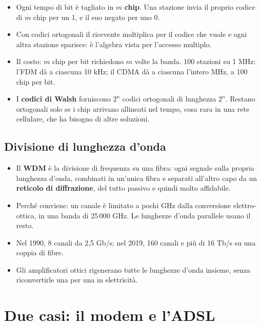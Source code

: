 \begin{itemize}
    \item Ogni tempo di bit è tagliato in $m$ \textbf{chip}. Una stazione invia il proprio codice di $m$ chip per un 1, e il suo negato
          per uno 0.
    \item Con codici ortogonali il ricevente moltiplica per il codice che vuole e ogni altra stazione sparisce: è l'algebra vista per
          l'accesso multiplo.
    \item Il costo: $m$ chip per bit richiedono $m$ volte la banda. 100 stazioni su 1 MHz: l'FDM dà a ciascuna 10 kHz; il CDMA dà a
          ciascuna l'intero MHz, a 100 chip per bit.
    \item I \textbf{codici di Walsh} forniscono $2^n$ codici ortogonali di lunghezza $2^n$. Restano ortogonali solo se i chip arrivano
          allineati nel tempo, cosa rara in una rete cellulare, che ha bisogno di altre soluzioni.
\end{itemize}

\subsection{Divisione di lunghezza d'onda}

\begin{itemize}
    \item Il \textbf{WDM} è la divisione di frequenza su una fibra: ogni segnale sulla propria lunghezza d'onda, combinati in un'unica
          fibra e separati all'altro capo da un \textbf{reticolo di diffrazione}, del tutto passivo e quindi molto affidabile.
    \item Perché conviene: un canale è limitato a pochi GHz dalla conversione elettro-ottica, in una banda di 25\,000 GHz. Le lunghezze
          d'onda parallele usano il resto.
    \item Nel 1990, 8 canali da 2,5 Gb/s; nel 2019, 160 canali e più di 16 Tb/s su una coppia di fibre.
    \item Gli amplificatori ottici rigenerano tutte le lunghezze d'onda insieme, senza riconvertirle una per una in elettricità.
\end{itemize}

\section{Due casi: il modem e l'ADSL}

